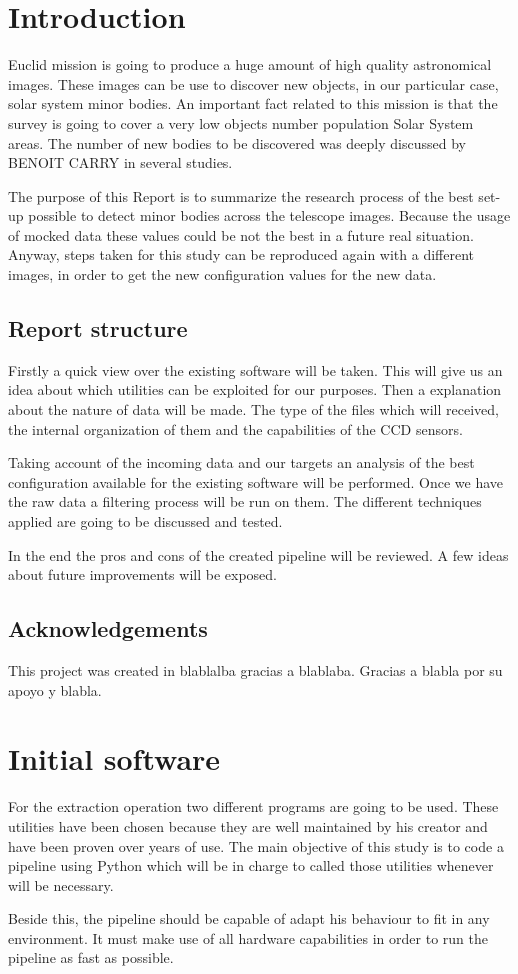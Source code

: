 \documentclass{article}
\begin{document}
\section{Introduction}
Euclid mission is going to produce a huge amount of high quality astronomical images. These images can be use to discover new objects, in our particular case, solar system minor bodies. An important fact related to this mission is that the survey is going to cover a very low objects number population Solar System areas. The number of new bodies to be discovered was deeply discussed by BENOIT CARRY in several studies.
\par
The purpose of this Report is to summarize the research process of the best set-up possible to detect minor bodies across the telescope images. Because the usage of mocked data these values could be not the best in a future real situation. Anyway, steps taken for this study can be reproduced again with a different images, in order to get the new configuration values for the new data.

\subsection{Report structure}
Firstly a quick view over the existing software will be taken. This will give us an idea about which utilities can be exploited for our purposes. Then a explanation about the nature of data will be made. The type of the files which will received, the internal organization of them and the capabilities of the CCD sensors.
\par Taking account of the incoming data and our targets an analysis of the best configuration available for the existing software will be performed. Once we have the raw data a filtering process will be run on them. The different techniques applied are going to be discussed and tested.
\par In the end the pros and cons of the created pipeline will be reviewed. A few ideas about future improvements will be exposed.

\subsection{Acknowledgements}
This project was created in blablalba gracias a blablaba. Gracias a blabla por su apoyo y blabla.

\section{Initial software}
For the extraction operation two different programs are going to be used. These utilities have been chosen because they are well maintained by his creator and have been proven over years of use. The main objective of this study is to code a pipeline using Python which will be in charge to called those utilities whenever will be necessary.
\par Beside this, the pipeline should be capable of adapt his behaviour to fit in any environment. It must make use of all hardware capabilities in order to run the pipeline as fast as possible.
\end{document}
